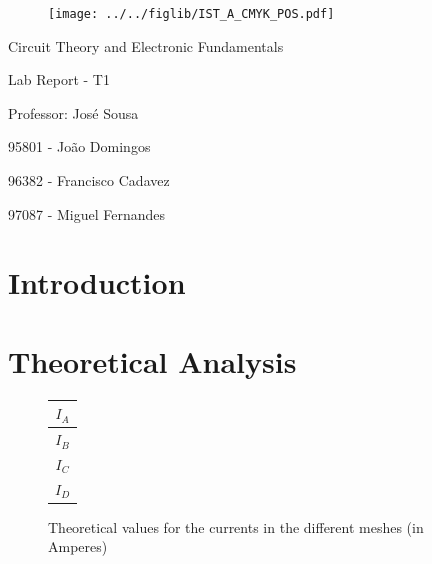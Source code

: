\documentclass[11pt]{article}
\begin{document}
\thispagestyle{empty}
\begin{figure}[h]
	\centering
	\texttt{[image: ../../figlib/IST\_A\_CMYK\_POS.pdf]}
\end{figure}

\begin{center}
	\huge{Circuit Theory and Electronic Fundamentals}
	
	\huge{Lab Report - T1}
	
	\vspace{30pt}
	
	\large{Professor: José Sousa}
	
	\vspace{20pt}
	
	\large{95801 - João Domingos}
	
	\large{96382 - Francisco Cadavez}
	
	\large{97087 - Miguel Fernandes}
\end{center}

\pagebreak

\tableofcontents

\pagebreak

\section{Introduction}


\section{Theoretical Analysis}

\begin{figure}[h]
	\begin{center}
	    \begin{minipage}{.3\textwidth}
		\flushright
		\begin{tabular}{|c|}
		    \hline
		    $I_A$ \\
		    \hline
		    $I_B$ \\
		    \hline
		    $I_C$ \\
		    \hline
		    $I_D$ \\
		    \hline
		\end{tabular}
	    \end{minipage}
	    \hspace{-7pt}
	    \begin{minipage}{.3\textwidth}
		\flushleft
		
	    \end{minipage}
	\end{center}
	\caption{Theoretical values for the currents in the different meshes (in Amperes)}
	\label{theory_currents}
\end{figure}
\end{document}
